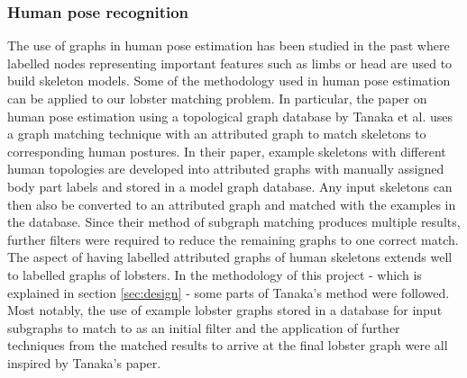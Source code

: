\subsubsection{Human pose recognition}
The use of graphs in human pose estimation has been studied in the past
\cite{human-pose, human-skeleton} where labelled nodes representing important features such as limbs or head are used to build skeleton models.
\n
Some of the methodology used in human pose estimation can be applied to our lobster matching problem. In particular, the paper on human pose estimation using a topological graph database by Tanaka et al. \cite{human-pose} uses a graph matching technique with an attributed graph to match skeletons to corresponding human postures. In their paper, example skeletons with different human topologies are developed into attributed graphs with manually assigned body part labels and stored in a model graph database. Any input skeletons can then also be converted to an attributed graph and matched with the examples in the database. Since their method of subgraph matching produces multiple results, further filters were required to reduce the remaining graphs to one correct match. 
\noindent
The aspect of having labelled attributed graphs of human skeletons extends well to labelled graphs of lobsters. In the methodology of this project - which is explained in section \ref{sec:design} - some parts of Tanaka's method were followed. Most notably, the use of example lobster graphs stored in a database for input subgraphs to match to as an initial filter and the application of further techniques from the matched results to arrive at the final lobster graph were all inspired by Tanaka's paper.
 
